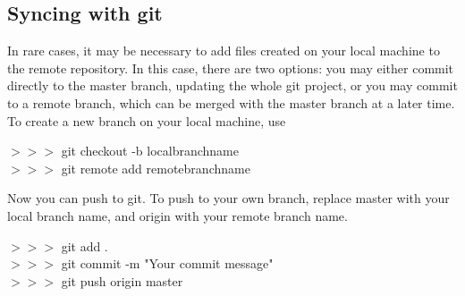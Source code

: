 \subsection{Syncing with git}

In rare cases, it may be necessary to add files created on your local machine to the remote repository. In this case, there are two options: you may either commit directly to the master branch, updating the whole git project, or you may commit to a remote branch, which can be merged with the master branch at a later time.\\

To create a new branch on your local machine, use
\begin{mdframed}
$>>>$ \quad git checkout -b localbranchname\\
$>>>$ \quad git remote add remotebranchname
\end{mdframed}

Now you can push to git. To push to your own branch, replace master with your local branch name, and origin with your remote branch name.

\begin{mdframed}
$>>>$ \quad git add .\\
$>>>$ \quad git commit -m "Your commit message"\\
$>>>$ \quad git push origin master
\end{mdframed}







